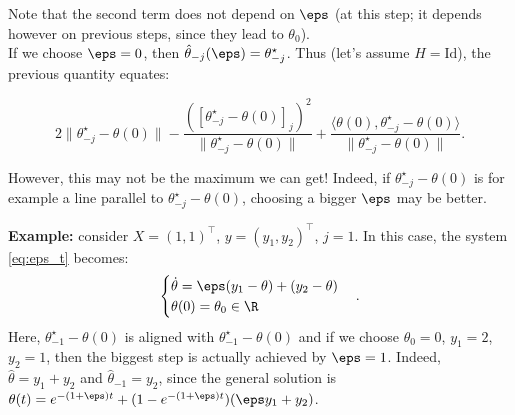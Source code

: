 Note that the second term does not depend on $\eps$ (at this step; it depends however on previous steps, since they lead to $\theta_0$).\\
If we choose $\eps = 0$, then $\hat\theta_{-j}(\eps) = \theta^\star_{-j}$. Thus (let's assume $H=\mathrm{Id}$), the previous quantity equates:

\begin{equation*}
  2\|\theta^\star_{-j}-\theta(0)\| - \frac{([\theta^\star_{-j}-\theta(0)]_j)^2}{\|\theta^\star_{-j}-\theta(0)\|} + \frac{\langle \theta(0), \theta^\star_{-j}-\theta(0)\rangle}{\|\theta^\star_{-j}-\theta(0)\|}.
\end{equation*}

However, this may not be the maximum we can get!
Indeed, if $\theta^\star_{-j}-\theta(0)$ is for example a line parallel to $\theta^\star_{-j}-\theta(0)$, choosing a bigger $\eps$ may be better.

\vspace{0.2cm}\noindent
\textbf{Example:} consider $X=(1,1)^\top$, $y=(y_1,y_2)^\top$, $j=1$. In this case, the system \ref{eq:eps_t} becomes:
\begin{equation*}
  \begin{cases}
    \dot \theta = \eps(y_1-\theta)+(y_2-\theta) \\
    \theta(0) = \theta_0 \in \R
  \end{cases}.
\end{equation*}
Here, $\theta^\star_{-1}-\theta(0)$ is aligned with $\theta^\star_{-1}-\theta(0)$ and if we choose $\theta_0=0$, $y_1=2$, $y_2=1$, then the biggest step is actually achieved by $\eps = 1$.
Indeed, $\hat\theta=y_1+y_2$ and $\hat\theta_{-1}=y_2$, since the general solution is $\theta(t)=e^{-(1+\eps)t}+(1-e^{-(1+\eps)t})(\eps y_1+y_2)$.

